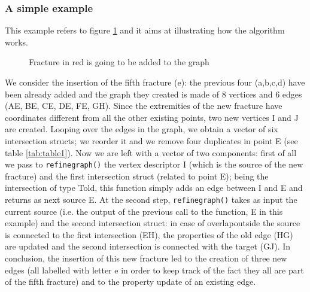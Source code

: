 \documentclass[10pt]{article} %
\begin{document}
	\subsubsection{A simple example}
	This example refers to figure \ref{fig:example_algo} and it aims at illustrating how the algorithm works.
	\begin{figure}
		\centering 
		\caption{Fracture in red is going to be added to the graph}
		\label{fig:example_algo}
	\end{figure}
	We consider the insertion of the fifth fracture (e): the previous four (a,b,c,d) have been already added and the graph they created is made of 8 vertices and 6 edges (AE, BE, CE, DE, FE, GH).  
	Since the extremities of the new fracture have coordinates different from all the other existing points, two new vertices I and J are created. Looping over the edges in the graph, we obtain a vector of six intersection structs; we reorder it and we remove four duplicates in point E (see table \ref{tab:table1}).
	Now we are left with a vector of two components: first of all we pass to \texttt{refine\textunderscore graph()} the vertex descriptor I (which is the source of the new fracture) and the first intersection struct (related to point E); being the intersection of type T\textunderscore old, this function simply adds an edge between I and E and returns as next source E. At the second step, \texttt{refine\textunderscore graph()} takes as input the current source (i.e. the output of the previous call to the function, E in this example) and the second intersection struct: in case of overlap\textunderscore outside the source is connected to the first intersection (EH), the properties of the old edge (HG) are updated and the second intersection is connected with the target (GJ). In conclusion, the insertion of this new fracture led to the creation of three new edges (all labelled with letter e in order to keep track of the fact they all are part of the fifth fracture) and to the property update of an existing edge.
	
\end{document}
